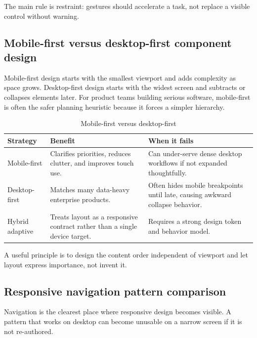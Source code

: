 The main rule is restraint: gestures should accelerate a task, not replace a visible control without warning.

\subsection{Mobile-first versus desktop-first component design}
Mobile-first design starts with the smallest viewport and adds complexity as space grows. Desktop-first design starts with the widest screen and subtracts or collapses elements later. For product teams building serious software, mobile-first is often the safer planning heuristic because it forces a simpler hierarchy.

\begin{table}[htbp]
  \centering
  \caption{Mobile-first versus desktop-first}
  \begin{tabularx}{\textwidth}{@{}p{}p{}Y@{}}
    \toprule
    \textbf{Strategy} & \textbf{Benefit} & \textbf{When it fails} \\
    \midrule
    Mobile-first & Clarifies priorities, reduces clutter, and improves touch use. & Can under-serve dense desktop workflows if not expanded thoughtfully. \\
    Desktop-first & Matches many data-heavy enterprise products. & Often hides mobile breakpoints until late, causing awkward collapse behavior. \\
    Hybrid adaptive & Treats layout as a responsive contract rather than a single device target. & Requires a strong design token and behavior model. \\
    \bottomrule
  \end{tabularx}
\end{table}

A useful principle is to design the content order independent of viewport and let layout express importance, not invent it.

\subsection{Responsive navigation pattern comparison}
Navigation is the clearest place where responsive design becomes visible. A pattern that works on desktop can become unusable on a narrow screen if it is not re-authored.

